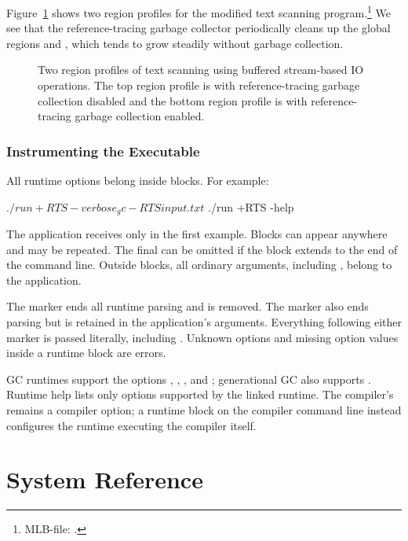 \documentclass[12pt]{book}
\begin{document}
Figure~\ref{scan-stream.fig} shows two region profiles for the modified text
scanning program.\footnote{MLB-file: .} We see that the
reference-tracing garbage collector periodically cleans up the global regions
 and , which tends to grow steadily without garbage collection.

\begin{figure}


\caption{Two region profiles of text scanning using buffered stream-based IO
  operations. The top region profile is with reference-tracing garbage
  collection disabled and the bottom region profile is with reference-tracing
  garbage collection enabled.}
\label{scan-stream.fig}
\end{figure}


\section{Instrumenting the Executable}
All runtime options belong inside  blocks. For example:
\begin{scriptcode}
  $ ./run +RTS -verbose_gc -RTS input.txt
  $ ./run +RTS -help
\end{scriptcode}
The application receives only  in the first example. Blocks can
appear anywhere and may be repeated. The final  can be omitted if the
block extends to the end of the command line. Outside blocks, all ordinary
arguments, including , belong to the application.

The marker  ends all runtime parsing and is removed. The marker
\kw{--} also ends parsing but is retained in the application's arguments.
Everything following either marker is passed literally, including .
Unknown options and missing option values inside a runtime block are errors.

GC runtimes support the options , , , and
; generational GC also supports .
Runtime help lists only options supported by the linked runtime. The compiler's
 remains a compiler option; a runtime block on the compiler command
line instead configures the runtime executing the compiler itself.

\part{System Reference}
\end{document}
